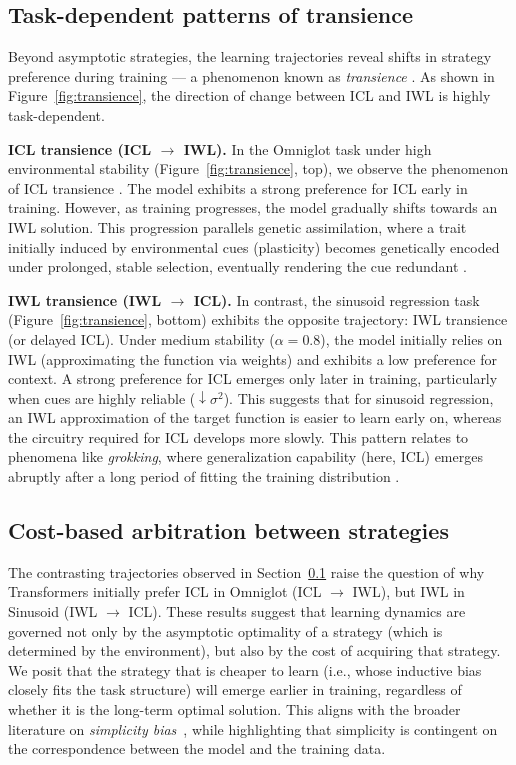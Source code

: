 \subsection{Task-dependent patterns of transience}
\label{sec:transience}

Beyond asymptotic strategies, the learning trajectories reveal shifts in strategy preference during training --- a phenomenon known as \textit{transience} \cite{singh2023transient,panwar2023context,singh_strategy_2025}. As shown in Figure~\ref{fig:transience}, the direction of change between ICL and IWL is highly task-dependent.

\textbf{ICL transience (ICL $\to$ IWL).} In the Omniglot task under high environmental stability (Figure~\ref{fig:transience}, top), we observe the phenomenon of ICL transience \cite{singh2023transient}. The model exhibits a strong preference for ICL early in training. However, as training progresses, the model gradually shifts towards an IWL solution. This progression parallels genetic assimilation, where a trait initially induced by environmental cues (plasticity) becomes genetically encoded under prolonged, stable selection, eventually rendering the cue redundant \cite{waddington1953genetic, pigliucci2006phenotypic}.

\textbf{IWL transience (IWL $\to$ ICL).} In contrast, the sinusoid regression task (Figure~\ref{fig:transience}, bottom) exhibits the opposite trajectory: IWL transience (or delayed ICL). Under medium stability ($\alpha=0.8$), the model initially relies on IWL (approximating the function via weights) and exhibits a low preference for context. A strong preference for ICL emerges only later in training, particularly when cues are highly reliable ($\downarrow\sigma^2$). This suggests that for sinusoid regression, an IWL approximation of the target function is easier to learn early on, whereas the circuitry required for ICL develops more slowly. This pattern relates to phenomena like \textit{grokking}, where generalization capability (here, ICL) emerges abruptly after a long period of fitting the training distribution \cite{power2022grokking}.

\subsection{Cost-based arbitration between strategies}
\label{subsec:relative_cost_hypothesis}

The contrasting trajectories observed in Section~\ref{sec:transience} raise the question of why Transformers initially prefer ICL in Omniglot (ICL $\to$ IWL), but IWL in Sinusoid (IWL $\to$ ICL). These results suggest that learning dynamics are governed not only by the asymptotic optimality of a strategy (which is determined by the environment), but also by the cost of acquiring that strategy. We posit that the strategy that is cheaper to learn (i.e., whose inductive bias closely fits the task structure) will emerge earlier in training, regardless of whether it is the long-term optimal solution.
This aligns with the broader literature on \textit{simplicity bias}~\cite{arpit2017closer,goldblum2023no,deora2025context}, while highlighting that simplicity is contingent on the correspondence between the model and the training data.

